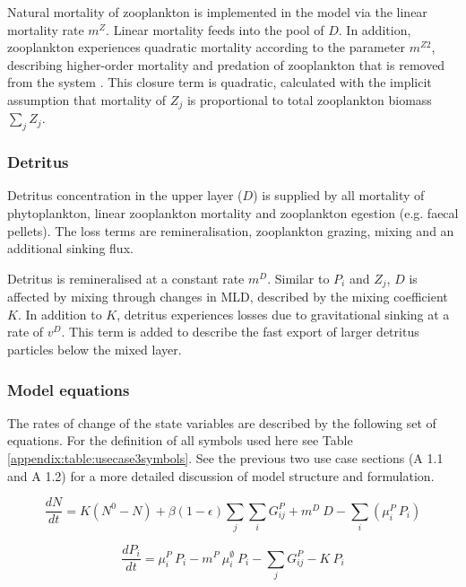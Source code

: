 \documentclass[template.tex]{subfiles}
\begin{document}
Natural mortality of zooplankton is implemented in the model via the linear mortality rate $m^Z$. Linear mortality feeds into the pool of $D$. In addition, zooplankton experiences quadratic mortality according to the parameter $m^{Z2}$, describing higher-order mortality and predation of zooplankton that is removed from the system \citep{Edwards2000TheModels}. This closure term is quadratic, calculated with the implicit assumption that mortality of $Z_j$ is proportional to total zooplankton biomass $\sum_{j} Z_j$.

\subsubsection{Detritus}
Detritus concentration in the upper layer ($D$) is supplied by all mortality of phytoplankton, linear zooplankton mortality and zooplankton egestion (e.g. faecal pellets). The loss terms are remineralisation, zooplankton grazing, mixing and an additional sinking flux. 

Detritus is remineralised at a constant rate $m^D$. Similar to $P_i$ and $Z_j$, $D$ is affected by mixing through changes in MLD, described by the mixing coefficient $K$. In addition to $K$, detritus experiences losses due to gravitational sinking at a rate of $v^D$. This term is added to describe the fast export of larger detritus particles below the mixed layer. 

\clearpage
\subsubsection{Model equations}
The rates of change of the state variables are described by the following set of equations. For the definition of all symbols used here see Table \ref{appendix:table:usecase3symbols}.
See the previous two use case sections (A 1.1 and A 1.2) for a more detailed discussion of model structure and formulation. 


\begin{equation}
    \frac{d N}{d t} = 
    K (N^0 - N) %
    +  \beta(1 - \epsilon)\sum_{j} \sum_{i} G_{ij}^P %
    +  m^D \ D %
    - \sum_{i} ( \mu_i^{P} \  P_i) %
\end{equation}

\begin{equation}
    \frac{d P_i}{d t} =
    \mu_i^{P} \   P_i  %
    - m^P  \ \mu_i^{\emptyset} \ P_i %
    - \sum_{j} G_{ij}^P %
    - K \ P_i%
\end{equation}
\end{document}
